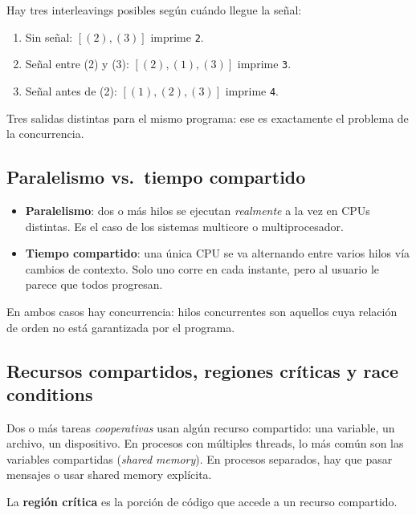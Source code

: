 \documentclass[11pt,a4paper]{article}
\begin{document}
Hay tres interleavings posibles según cuándo llegue la señal:

\begin{enumerate}[leftmargin=*,nosep]
    \item Sin señal: $[(2),(3)]$ imprime \texttt{2}.
    \item Señal entre (2) y (3): $[(2),(1),(3)]$ imprime \texttt{3}.
    \item Señal antes de (2): $[(1),(2),(3)]$ imprime \texttt{4}.
\end{enumerate}

Tres salidas distintas para el mismo programa: ese es exactamente el
problema de la concurrencia.

\subsection{Paralelismo vs.\ tiempo compartido}

\begin{itemize}[leftmargin=*,nosep]
    \item \textbf{Paralelismo}: dos o más hilos se ejecutan
        \emph{realmente} a la vez en CPUs distintas. Es el caso de
        los sistemas multicore o multiprocesador.
    \item \textbf{Tiempo compartido}: una única CPU se va alternando
        entre varios hilos vía cambios de contexto. Solo uno corre
        en cada instante, pero al usuario le parece que todos
        progresan.
\end{itemize}

En ambos casos hay concurrencia: hilos concurrentes son aquellos cuya
relación de orden no está garantizada por el programa.

\subsection{Recursos compartidos, regiones críticas y race conditions}

Dos o más tareas \emph{cooperativas} usan algún recurso compartido:
una variable, un archivo, un dispositivo. En procesos con múltiples
threads, lo más común son las variables compartidas (\emph{shared
memory}). En procesos separados, hay que pasar mensajes o usar
shared memory explícita.

\begin{definicion}
La \textbf{región crítica} es la porción de código que accede a un
recurso compartido.
\end{definicion}
\end{document}
